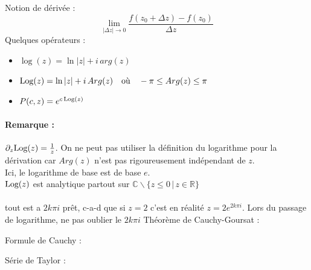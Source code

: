 Notion de dérivée : $$\lim_{|\Delta  z|\rightarrow 0} \frac{f(z_0+\Delta z)-f(z_0)}{\Delta z} $$
Quelques opérateurs : \begin{itemize}
\item $\log(z)=\ln|z|+i\,arg(z)$
\item $\Log(z) =\ln|z|+i\,Arg(z)\quad\text{où}\quad -\pi\leq Arg(z)\leq \pi$ 
\item $P(c,z) = e^{c\,\Log(z)}$
\end{itemize}
\paragraph{Remarque : } $\partial_z\Log(z)=\frac{1}{z}$. On ne peut pas utiliser la définition du logarithme pour la dérivation car $Arg(z)$ n'est pas rigoureusement indépendant de $z$.\\
Ici, le logarithme de base est de base  $e$.\\
$\Log(z)$ est analytique partout sur $\mathbb{C}\backslash\{z\leq 0\,|\,z\in\mathbb{R}\}$\\\\
\danger tout est a $2k\pi i$ prêt, c-a-d que si $z = 2$ c'est en réalité $z = 2e^{2k\pi i}$. Lors du passage de logarithme, ne pas oublier le $2k\pi i$
Théorème de Cauchy-Goursat : \begin{center}
\end{center}
\newpage
Formule de Cauchy : \begin{center}
\end{center}

\seancesection{}
Série de Taylor : \begin{center}
\end{center}

